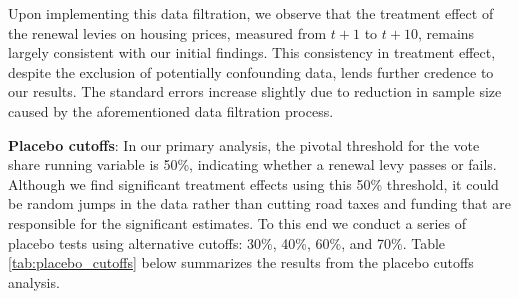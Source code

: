 Upon implementing this data filtration, we observe that the treatment effect of the renewal levies on housing prices, measured from $t+1$ to $t+10$, remains largely consistent with our initial findings. This consistency in treatment effect, despite the exclusion of potentially confounding data, lends further credence to our results. The standard errors increase slightly due to reduction in sample size caused by the aforementioned data filtration process. 

\textbf{Placebo cutoffs}: In our primary analysis, the pivotal threshold for the vote share running variable is 50\%, indicating whether a renewal levy passes or fails.  Although we find significant treatment effects using this 50\% threshold, it could be random jumps in the data rather than cutting road taxes and funding that are responsible for the significant estimates.  To this end we conduct a series of placebo tests using alternative cutoffs: 30\%, 40\%, 60\%, and 70\%. Table \ref{tab:placebo_cutoffs} below summarizes the results from the placebo cutoffs analysis. 

